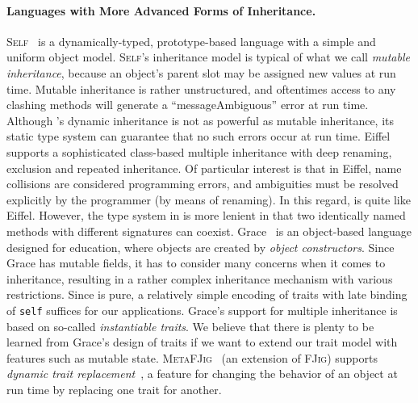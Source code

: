 \paragraph{Languages with More Advanced Forms of Inheritance.}
\textsc{Self}~\citep{ungar1988self} is a dynamically-typed, prototype-based
language with a simple and uniform object model. \textsc{Self}'s inheritance
model is typical of what we call \textit{mutable inheritance}, because an object's parent
slot may be assigned new values at run time. Mutable inheritance is rather
unstructured, and oftentimes access to any clashing methods will generate a
``messageAmbiguous'' error at run time. Although \name's dynamic inheritance is
not as powerful as mutable inheritance, its static type system can guarantee
that no such errors occur at run time. Eiffel~\citep{meyer1987eiffel} supports a
sophisticated class-based multiple inheritance with deep renaming, exclusion
and repeated inheritance. Of particular interest is that in Eiffel, name
collisions are considered programming errors, and ambiguities must be resolved
explicitly by the programmer (by means of renaming). In this regard, \name is
quite like Eiffel. However, the type system in \name is more lenient in that two
identically named methods with different signatures can coexist. Grace~\citep{DBLP:journals/jot/NobleBBHJ17, DBLP:conf/ecoop/0002HNB16}
is an object-based language designed for education, where objects are created by
\textit{object constructors}.
Since Grace has mutable fields, it has to consider
many concerns when it comes to inheritance, resulting in a rather complex
inheritance mechanism with various restrictions.
Since \name is pure, a relatively simple
encoding of traits with late binding of \lstinline{self}
suffices for our applications. Grace's support for multiple inheritance is
based on so-called \emph{instantiable traits}.
We believe that there is plenty to be learned from
Grace's design of traits if we want to extend our trait model with
features such as mutable state. \textsc{MetaFJig}~\citep{SERVETTO2014219} (an extension of \textsc{FJig})
supports \textit{dynamic trait replacement}~\citep{chai_trait, BETTINI2013907, Ducasse_2006},
a feature for changing the behavior of an object at run time by replacing one trait for another.




